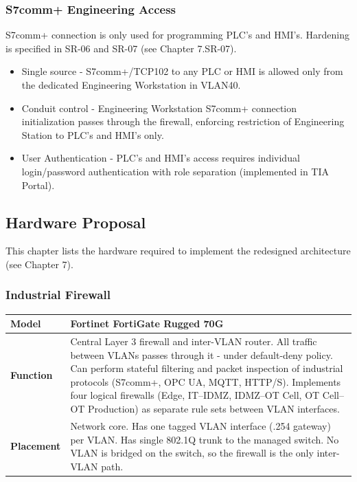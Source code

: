 \documentclass[11pt,a4paper]{article}
\renewcommand{\arraystretch}{1.15}
\begin{document}
\subsubsection{S7comm+ Engineering Access}
S7comm+ connection is only used for programming PLC's and HMI's. Hardening is
specified in SR-06 and SR-07 (see Chapter 7.SR-07).

\begin{itemize}

    \item Single source - S7comm+/TCP102 to any PLC or HMI is allowed only from
        the dedicated Engineering Workstation in VLAN40.

    \item Conduit control - Engineering Workstation S7comm+ connection
        initialization passes through the firewall, enforcing restriction of
        Engineering Station to PLC's and HMI's only.

    \item User Authentication - PLC's and HMI's access requires individual
        login/password authentication with role separation (implemented in TIA
        Portal).

\end{itemize}

\subsection{Hardware Proposal}
This chapter lists the hardware required to implement the redesigned
architecture (see Chapter 7). 

\subsubsection{Industrial Firewall}
\renewcommand{\arraystretch}{1.3} %
\begin{tabularx}{\textwidth}{>{\bfseries}p{2.5cm} X}
    \toprule
    Model & Fortinet FortiGate Rugged 70G \\
    \midrule
    Function & Central Layer 3 firewall and inter-VLAN router. All traffic
    between VLANs passes through it - under default-deny policy. Can perform
    stateful filtering and packet inspection of industrial protocols (S7comm+,
    OPC UA, MQTT, HTTP/S). Implements four logical firewalls (Edge, IT–IDMZ,
    IDMZ–OT Cell, OT Cell–OT Production) as separate rule sets between VLAN
    interfaces. \\
    \midrule
    Placement & Network core. Has one tagged VLAN interface (.254 gateway) per
    VLAN. Has single 802.1Q trunk to the managed switch. No VLAN is bridged on
    the switch, so the firewall is the only inter-VLAN path. \\
    \midrule
\end{tabularx}
\end{document}
